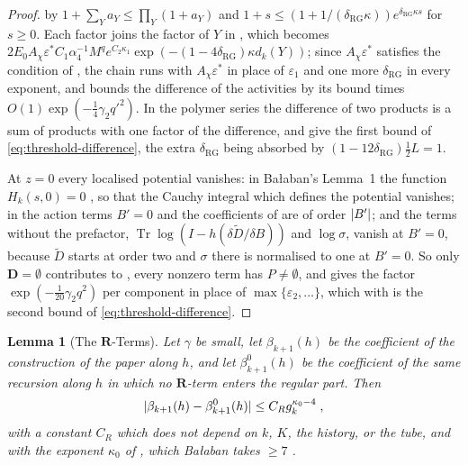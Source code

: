 \documentclass[11pt]{preprint}
\DeclarePairedDelimiter{\abs}{\lvert}{\rvert}
\numberwithin{equation}{section}
\newtheorem{lemma}{Lemma}[section]
\theoremstyle{definition}
\theoremstyle{remark}
\theoremstyle{plain}
\begin{document}
\begin{proof}
by $1 + \sum_Ya_Y \leq \prod_Y(1 + a_Y)$ and $1 + s \leq (1 + 1/(\delta_{\mathrm{RG}}\kappa))e^{\delta_{\mathrm{RG}}\kappa s}$ for $s \geq 0$. Each factor joins the factor of $Y$ in \cite[(2.26), p.~17]{BalabanRG2}, which becomes $2E_0A_\chi\varepsilon^*C_1\alpha_4^{-1}M^qe^{C_2\kappa_1}\exp(-(1 - 4\delta_{\mathrm{RG}})\kappa d_k(Y))$; since $A_\chi\varepsilon^*$ satisfies the condition of \cite[p.~18]{BalabanRG2}, the chain \cite[(2.27)--(2.38)]{BalabanRG2} runs with $A_\chi\varepsilon^*$ in place of $\varepsilon_1$ and one more $\delta_{\mathrm{RG}}$ in every exponent, and bounds the difference of the activities by its bound times $O(1)\exp(-\frac14\gamma_2q'^2)$. In the polymer series \cite[(2.13)]{BalabanRG2} the difference of two products is a sum of products with one factor of the difference, and \cite[(2.39)--(2.41)]{BalabanRG2} give the first bound of \eqref{eq:threshold-difference}, the extra $\delta_{\mathrm{RG}}$ being absorbed by $(1 - 12\delta_{\mathrm{RG}})\frac12L = 1$.

At $z = 0$ every localised potential vanishes: in Ba{\l}aban's Lemma~1 the function $H_k(s, 0) = 0$ \cite[(1.18), p.~6]{BalabanRG2}, so that the Cauchy integral which defines the potential vanishes; in the action terms $B' = 0$ and the coefficients of \cite[(1.40)]{BalabanRG2} are of order $\abs{B'}$; and the terms without the prefactor, $\operatorname{Tr}\log(I - h(\delta\tilde D/\delta B))$ and $\log\sigma$, vanish at $B' = 0$, because $\tilde D$ starts at order two and $\sigma$ there is normalised to one at $B' = 0$. So only $\mathbf D = \emptyset$ contributes to \cite[(2.1)]{BalabanRG2}, every nonzero term has $P \neq \emptyset$, and \cite[(2.33)]{BalabanRG2} gives the factor $\exp(-\frac{1}{20}\gamma_2q^2)$ per component in place of $\max\{ \varepsilon_2, \dots \}$, which with \cite[(2.37)--(2.41)]{BalabanRG2} is the second bound of \eqref{eq:threshold-difference}.
\end{proof}

\begin{lemma}[The $\mathbf R$-Terms]\label{lem:r-term-shift}
Let $\gamma$ be small, let $\beta_{k+1}(h)$ be the coefficient of the construction of the paper along $h$, and let $\beta^0_{k+1}(h)$ be the coefficient of the same recursion along $h$ in which no $\mathbf R$-term enters the regular part. Then
\begin{equation}\label{eq:r-term-shift}
    \abs{\beta_{k+1}(h) - \beta^0_{k+1}(h)} \leq C_Rg_k^{\kappa_0-4}\;,
\end{equation}
with a constant $C_R$ which does not depend on $k$, $K$, the history, or the tube, and with the exponent $\kappa_0$ of \cite[(2.31), p.~260]{BalabanCRE}, which Ba{\l}aban takes $\geq 7$ \cite[(2.46), p.~263]{BalabanCRE}.
\end{lemma}
\end{document}
